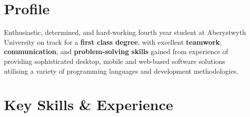\documentclass[a4paper, 10pt]{extarticle} %
\begin{document}
\section{Profile}

{\small Enthusiastic, determined, and hard-working fourth year student at Aberystwyth University on track for a \textbf{first class degree}, with excellent \textbf{teamwork}, \textbf{communication}, and \textbf{problem-solving skills} gained from experience of providing sophisticated desktop, mobile and web-based software solutions utilising a variety of programming languages and development methodologies.}


\section{Key Skills \& Experience}
\end{document}
